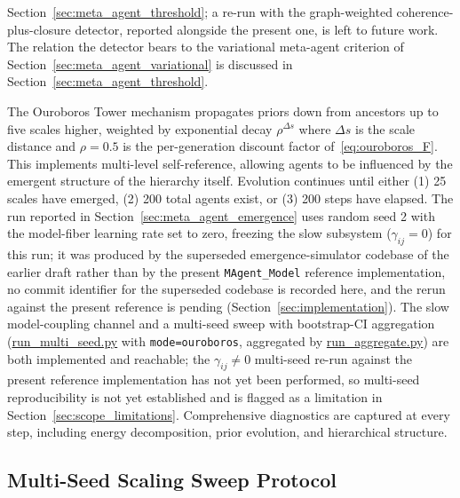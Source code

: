 \documentclass[11pt]{article}
\begin{document}
Section~\ref{sec:meta_agent_threshold}; a re-run with the graph-weighted coherence-plus-closure detector, reported alongside the present one, is left to future work. The relation the detector bears to the variational meta-agent criterion of Section~\ref{sec:meta_agent_variational} is discussed in Section~\ref{sec:meta_agent_threshold}.

The Ouroboros Tower mechanism propagates priors down from ancestors up to five scales higher, weighted by exponential decay $\rho^{\Delta s}$ where $\Delta s$ is the scale distance and $\rho = 0.5$ is the per-generation discount factor of~\eqref{eq:ouroboros_F}. This implements multi-level self-reference, allowing agents to be influenced by the emergent structure of the hierarchy itself. Evolution continues until either (1) 25 scales have emerged, (2) 200 total agents exist, or (3) 200 steps have elapsed. The run reported in Section~\ref{sec:meta_agent_emergence} uses random seed 2 with the model-fiber learning rate set to zero, freezing the slow subsystem ($\gamma_{ij} = 0$) for this run; it was produced by the superseded emergence-simulator codebase of the earlier draft rather than by the present \texttt{MAgent\_Model} reference implementation, no commit identifier for the superseded codebase is recorded here, and the rerun against the present reference is pending (Section~\ref{sec:implementation}). The slow model-coupling channel and a multi-seed sweep with bootstrap-CI aggregation (\url{run_multi_seed.py} with \texttt{mode=\textquotesingle ouroboros\textquotesingle}, aggregated by \url{run_aggregate.py}) are both implemented and reachable; the $\gamma_{ij} \neq 0$ multi-seed re-run against the present reference implementation has not yet been performed, so multi-seed reproducibility is not yet established and is flagged as a limitation in Section~\ref{sec:scope_limitations}. Comprehensive diagnostics are captured at every step, including energy decomposition, prior evolution, and hierarchical structure.

\subsection{Multi-Seed Scaling Sweep Protocol}
\label{sec:methods_scaling}
\end{document}

